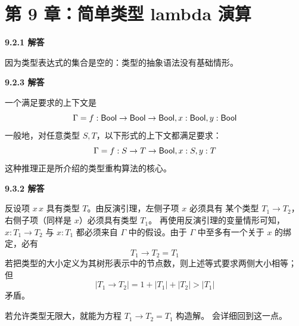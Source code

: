 \section{第 9 章：简单类型 lambda 演算}

\begin{taplauthorsolutionentrybox}
\label{sol:author:9.2.1}
\textbf{9.2.1 解答}

因为类型表达式的集合是空的：类型的抽象语法没有基础情形。


\end{taplauthorsolutionentrybox}

\begin{taplauthorsolutionentrybox}
\label{sol:author:9.2.3}
\textbf{9.2.3 解答}

一个满足要求的上下文是
\[
  \Gamma=
  f:\mathsf{Bool}\to\mathsf{Bool}\to\mathsf{Bool},
  x:\mathsf{Bool},
  y:\mathsf{Bool}
\]
一般地，对任意类型 \(S,T\)，以下形式的上下文都满足要求：
\[
  \Gamma=
  f:S\to T\to\mathsf{Bool},
  x:S,
  y:T
\]
这种推理正是所介绍的类型重构算法的核心。

\end{taplauthorsolutionentrybox}

\begin{taplauthorsolutionentrybox}
\label{sol:author:9.3.2}
\textbf{9.3.2 解答}

反设项 \(x\,x\) 具有类型 \(T\)。由反演引理，左侧子项 \(x\) 必须具有
某个类型 \(T_1\to T_2\)，右侧子项（同样是 \(x\)）必须具有类型 \(T_1\)。
再使用反演引理的变量情形可知，\(x:T_1\to T_2\) 与 \(x:T_1\) 都必须来自
\(\Gamma\) 中的假设。由于 \(\Gamma\) 中至多有一个关于 \(x\) 的绑定，必有
\[
  T_1\to T_2=T_1
\]
若把类型的大小定义为其树形表示中的节点数，则上述等式要求两侧大小相等；
但
\[
  \lvert T_1\to T_2\rvert
  =1+\lvert T_1\rvert+\lvert T_2\rvert
  >\lvert T_1\rvert
\]
矛盾。


若允许类型无限大，就能为方程 \(T_1\to T_2=T_1\) 构造解。
会详细回到这一点。

\end{taplauthorsolutionentrybox}


